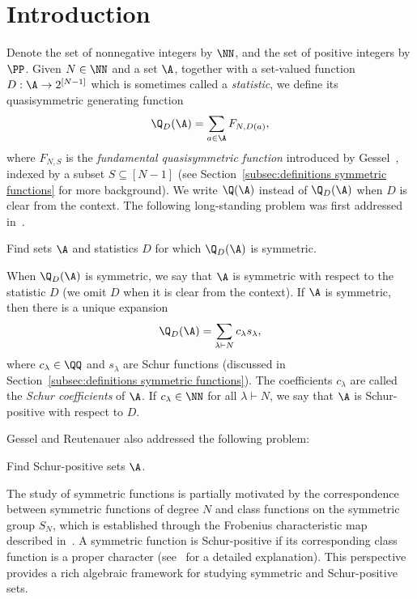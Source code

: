 \section{Introduction}
\label{sec:introduction}

Denote the set of nonnegative integers by $\NN$, and the set of positive integers by $\PP$. Given $N\in \NN$ and a set $\A$, together with a set-valued function $D:\A\to 2^{[N-1]}$ which is sometimes called a \emph{statistic}, we define its quasisymmetric generating function
\[
    \Q_{D} (\A) = \sum_{a \in \A} F_{N, D(a)},
\]
where $F_{N, S}$ is the \emph{fundamental quasisymmetric function} introduced by Gessel~\cite{knuth_classes_schur_positive}, indexed by a subset $S \subseteq [N-1]$ (see Section~\ref{subsec:definitions symmetric functions} for more background). We write $\Q(\A)$ instead of $\Q_{D}(\A)$ when $D$ is clear from the context.
The following long-standing problem was first addressed in~\cite{gessel1993counting}.
\begin{problem}
    Find sets $\A$ and statistics $D$ for which $\Q_{D}(\A)$ is symmetric.
\end{problem}

When $\Q_{D}(\A)$ is symmetric, we say that $\A$ is symmetric with respect to the statistic $D$ (we omit $D$ when it is clear from the context). If $\A$ is symmetric, then there is a unique expansion
\[
    \Q_{D} (\A) = \sum_{\lambda \vdash N} c_\lambda s_\lambda,
\]
where $c_\lambda \in \QQ$ and $s_\lambda$ are Schur functions (discussed in Section~\ref{subsec:definitions symmetric functions}). The coefficients $c_\lambda$ are called the \emph{Schur coefficients} of $\A$.
If $c_\lambda \in \NN$ for all $\lambda \vdash N$, we say that $\A$ is Schur-positive with respect to $D$.

Gessel and Reutenauer also addressed the following problem:
\begin{problem}
    Find Schur-positive sets $\A$.
\end{problem}






The study of symmetric functions is partially motivated by the correspondence between symmetric functions of degree $N$ and class functions on the symmetric group $S_N$, which is established through the Frobenius characteristic map described in~\cite[Chapter 4.7]{sagan_book}. A symmetric function is Schur-positive if its corresponding class function is a proper character (see~\cite{adin_roichman_fine_set} for a detailed explanation). This perspective provides a rich algebraic framework for studying symmetric and Schur-positive sets.

